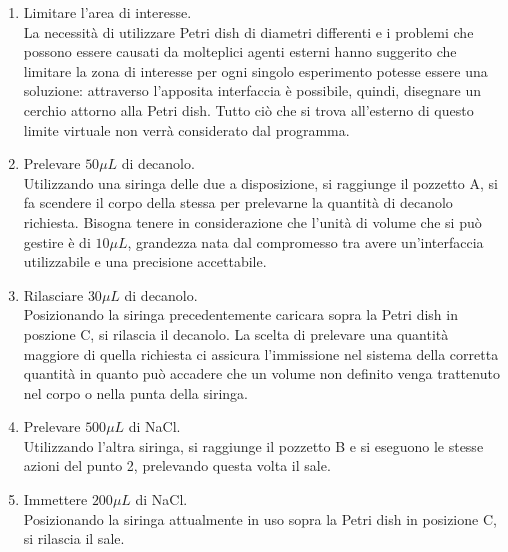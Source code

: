 \begin{enumerate}

	\item Limitare l'area di interesse.\\
		La necessità di utilizzare Petri dish di diametri differenti e i problemi che possono essere causati da molteplici agenti esterni hanno suggerito che limitare la zona di interesse per ogni singolo esperimento potesse essere una soluzione: attraverso l'apposita interfaccia è possibile, quindi, disegnare un cerchio attorno alla Petri dish. Tutto ciò che si trova all'esterno di questo limite virtuale non verrà considerato dal programma.

	\item Prelevare $50\mu L$ di decanolo.\\
		Utilizzando una siringa delle due a disposizione, si raggiunge il pozzetto A, si fa scendere il corpo della stessa per prelevarne la quantità di decanolo richiesta. Bisogna tenere in considerazione che l'unità di volume che si può gestire è di $10\mu L$, grandezza nata dal compromesso tra avere un'interfaccia utilizzabile e una precisione accettabile. 

	\item Rilasciare $30\mu L$ di decanolo.\\
		 Posizionando la siringa precedentemente caricara sopra la Petri dish in poszione C, si rilascia il decanolo. 
La scelta di prelevare una quantità maggiore di quella richiesta ci assicura l'immissione nel sistema della corretta quantità in quanto può accadere che un volume non definito venga trattenuto nel corpo o nella punta della siringa.

	\item  Prelevare $500\mu L$ di NaCl. \\
		Utilizzando l'altra siringa, si raggiunge il pozzetto B e si eseguono le stesse azioni del punto 2, prelevando questa volta il sale. 
	
	\item Immettere $200\mu L$ di NaCl.\\
		Posizionando la siringa attualmente in uso sopra la Petri dish in posizione C, si rilascia il sale. 
\end{enumerate}




